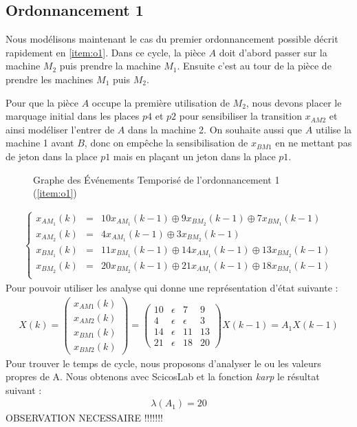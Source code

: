 \subsection{Ordonnancement 1}
Nous modélisons maintenant le cas du premier ordonnancement possible décrit rapidement en \ref{item:o1}. Dans ce cycle, la pièce $A$ doit d'abord passer sur la machine $M_2$ puis prendre la machine $M_1$. Ensuite c'est au tour de la pièce de prendre les machines $M_1$ puis $M_2$. 

Pour que la pièce $A$ occupe la première utilisation de $M_2$, nous devons placer le marquage initial dans les places $p4$ et $p2$ pour sensibiliser la transition $x_{AM2}$ et ainsi modéliser l'entrer de $A$ dans la machine 2. On souhaite aussi que $A$ utilise la machine 1 avant $B$, donc on empêche la sensibilisation de $x_{BM1}$ en ne mettant pas de jeton dans la place $p1$ mais en plaçant un jeton dans la place $p1$. 
\begin{figure}[!ht]
\centering
\caption{\label{fig:get} Graphe des Événements Temporisé de l'ordonnancement 1 (\ref{item:o1})}
\end{figure}

\begin{align*}
\left\lbrace
\begin{array}{lcl}
x_{AM_1}(k)&=& 10x_{AM_1}(k-1) \oplus 9x_{BM_2}(k-1)\oplus 7x_{BM_1}(k-1)\\
x_{AM_2}(k)&=&4x_{AM_1}(k-1) \oplus 3x_{BM_2}(k-1)\\
x_{BM_1}(k)&=& 11x_{BM_1}(k-1) \oplus 14x_{AM_1}(k-1) \oplus 13x_{BM_2}(k-1)\\
x_{BM_2}(k)&=& 20x_{BM_2}(k-1) \oplus 21x_{AM_1}(k-1) \oplus 18x_{BM_1}(k-1)\\
\end{array}
\right.
\end{align*} Pour pouvoir utiliser les analyse qui donne une représentation d'état suivante : 
\begin{align}\label{equ:ordo1}
X(k) = \begin{pmatrix}
x_{AM1}(k) \\ x_{AM2}(k) \\ x_{BM1}(k)\\ x_{BM2}(k)
\end{pmatrix} 
= \begin{pmatrix}
10 & \epsilon & 7 &9\\
4 & \epsilon & \epsilon & 3\\
14 & \epsilon & 11 & 13\\
21 & \epsilon & 18 & 20
\end{pmatrix}X(k-1) = A_1X(k-1)
\end{align}
Pour trouver le temps de cycle, nous proposons d'analyser le ou les valeurs propres de A. Nous obtenons avec ScicosLab et la fonction \emph{karp} le résultat suivant : \begin{eqnarray*}
\lambda(A_1) = 20
\end{eqnarray*}
OBSERVATION NECESSAIRE !!!!!!! %
